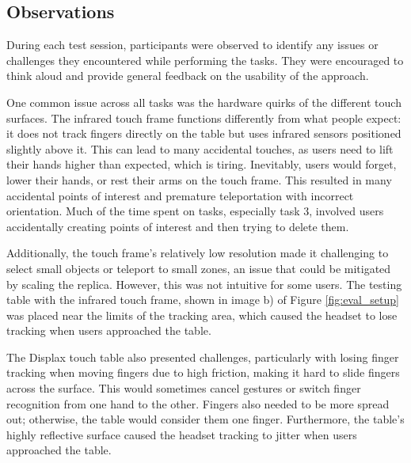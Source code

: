     \subsection{Observations}

        During each test session, participants were observed to identify any issues or challenges they encountered while performing the tasks. They were encouraged to think aloud and provide general feedback on the usability of the approach.

        One common issue across all tasks was the hardware quirks of the different touch surfaces. The infrared touch frame functions differently from what people expect: it does not track fingers directly on the table but uses infrared sensors positioned slightly above it. This can lead to many accidental touches, as users need to lift their hands higher than expected, which is tiring. Inevitably, users would forget, lower their hands, or rest their arms on the touch frame. This resulted in many accidental points of interest and premature teleportation with incorrect orientation. Much of the time spent on tasks, especially task 3, involved users accidentally creating points of interest and then trying to delete them.

        Additionally, the touch frame's relatively low resolution made it challenging to select small objects or teleport to small zones, an issue that could be mitigated by scaling the replica. However, this was not intuitive for some users. The testing table with the infrared touch frame, shown in image b) of Figure \ref{fig:eval_setup} was placed near the limits of the tracking area, which caused the headset to lose tracking when users approached the table. 

        The Displax touch table also presented challenges, particularly with losing finger tracking when moving fingers due to high friction, making it hard to slide fingers across the surface. This would sometimes cancel gestures or switch finger recognition from one hand to the other. Fingers also needed to be more spread out; otherwise, the table would consider them one finger. Furthermore, the table's highly reflective surface caused the headset tracking to jitter when users approached the table.

